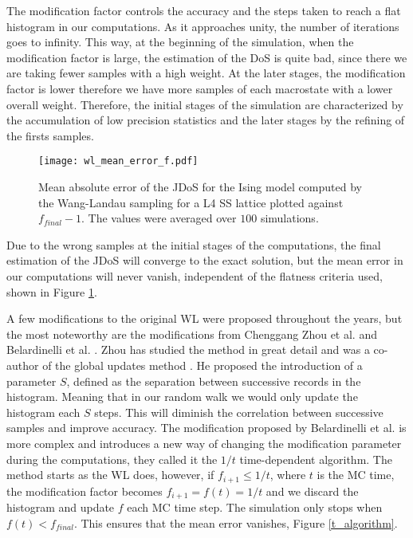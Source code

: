 The modification factor controls the accuracy and the steps taken to reach a flat histogram in our computations. As it approaches unity, the number of iterations goes to infinity. This way, at the beginning of the simulation, when the modification factor is large, the estimation of the DoS is quite bad, since there we are taking fewer samples with a high weight. At the later stages, the modification factor is lower therefore we have more samples of each macrostate with a lower overall weight. 
Therefore, the initial stages of the simulation are characterized by the accumulation of low precision statistics and the later stages by the refining of the firsts samples. 

\begin{figure}[h]
	\centering
	\texttt{[image: wl\_mean\_error\_f.pdf]}
	\caption{Mean absolute error of the JDoS for the Ising model computed by the Wang-Landau sampling for a L4 SS lattice plotted against $f_{final}-1$. The values were averaged over $100$ simulations. }
	\label{error_abs_wl}
\end{figure}

Due to the wrong samples at the initial stages of the computations, the final estimation of the JDoS will converge to the exact solution, but the mean error in our computations will never vanish, independent of the flatness criteria used, shown in Figure \ref{error_abs_wl}. 

A few modifications to the original WL were proposed throughout the years, but the most noteworthy  are the modifications from Chenggang Zhou et al. \cite{Zhou2005} and Belardinelli et al. \cite{Belardinelli2007}. Zhou has studied the method in great detail \cite{Zhou2005} and was a co-author of the global updates method \cite{WL_Cont}. He proposed the introduction of a parameter $S$, defined as the separation between successive records in the histogram. Meaning that in our random walk we would only update the histogram each $S$ steps. This will diminish the correlation between successive samples and improve accuracy.  
The modification proposed by Belardinelli et al. is more complex and introduces a new way of changing the modification parameter during the computations, they called it the $1/t$ time-dependent algorithm. The method starts as the WL does, however, if $f_{i+1} \leqslant 1/t$, where $t$ is the MC time, the modification factor becomes $f_{i+1} = f(t) = 1/t$ and we discard the histogram and update $f$ each MC time step. The simulation only stops when $f(t) < f_{final}$. This ensures that the mean error vanishes, Figure \ref{t_algorithm}.



